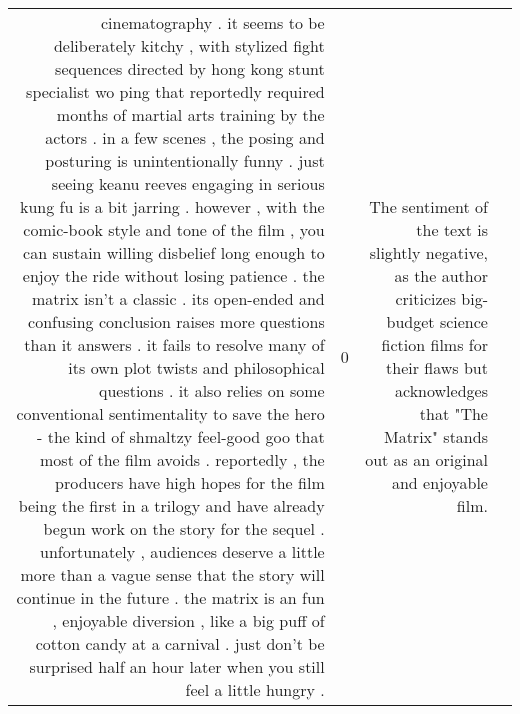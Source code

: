 \begin{tabular}{r{1cm} p{0.4in} r{1cm} p{0.4in}}
cinematography .  it seems to be deliberately kitchy , with stylized fight sequences directed by hong kong stunt specialist wo ping that reportedly required months of martial arts training by the actors .  in a few scenes , the posing and posturing is unintentionally funny .  just seeing keanu reeves engaging in serious kung fu is a bit jarring .  however , with the comic-book style and tone of the film , you can sustain willing disbelief long enough to enjoy the ride without losing patience .  the matrix isn't a classic .  its open-ended and confusing conclusion raises more questions than it answers .  it fails to resolve many of its own plot twists and philosophical questions .  it also relies on some conventional sentimentality to save the hero - the kind of shmaltzy feel-good goo that most of the film avoids .  reportedly , the producers have high hopes for the film being the first in a trilogy and have already begun work on the story for the sequel .  unfortunately , audiences deserve a little more than a vague sense that the story will continue in the future .  the matrix is an fun , enjoyable diversion , like a big puff of cotton candy at a carnival .  just don't be surprised half an hour later when you still feel a little hungry .   & 0 & The sentiment of the text is slightly negative, as the author criticizes big-budget science fiction films for their flaws but acknowledges that "The Matrix" stands out as an original and enjoyable film. \\

\end{tabular}
